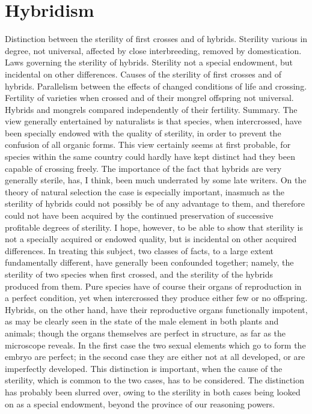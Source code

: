 \chapter{Hybridism}
Distinction between the sterility of first crosses and of hybrids. Sterility various in degree, not universal, affected by close interbreeding, removed by domestication. Laws governing the sterility of hybrids. Sterility not a special endowment, but incidental on other differences. Causes of the sterility of first crosses and of hybrids. Parallelism between the effects of changed conditions of life and crossing. Fertility of varieties when crossed and of their mongrel offspring not universal. Hybrids and mongrels compared independently of their fertility. Summary.
The view generally entertained by naturalists is that species, when intercrossed, have been specially endowed with the quality of sterility, in order to prevent the confusion of all organic forms. This view certainly seems at first probable, for species within the same country could hardly have kept distinct had they been capable of crossing freely. The importance of the fact that hybrids are very generally sterile, has, I think, been much underrated by some late writers. On the theory of natural selection the case is especially important, inasmuch as the sterility of hybrids could not possibly be of any advantage to them, and therefore could not have been acquired by the continued preservation of successive profitable degrees of sterility. I hope, however, to be able to show that sterility is not a specially acquired or endowed quality, but is incidental on other acquired differences.
In treating this subject, two classes of facts, to a large extent fundamentally different, have generally been confounded together; namely, the sterility of two species when first crossed, and the sterility of the hybrids produced from them.
Pure species have of course their organs of reproduction in a perfect condition, yet when intercrossed they produce either few or no offspring. Hybrids, on the other hand, have their reproductive organs functionally impotent, as may be clearly seen in the state of the male element in both plants and animals; though the organs themselves are perfect in structure, as far as the microscope reveals. In the first case the two sexual elements which go to form the embryo are perfect; in the second case they are either not at all developed, or are imperfectly developed. This distinction is important, when the cause of the sterility, which is common to the two cases, has to be considered. The distinction has probably been slurred over, owing to the sterility in both cases being looked on as a special endowment, beyond the province of our reasoning powers.
